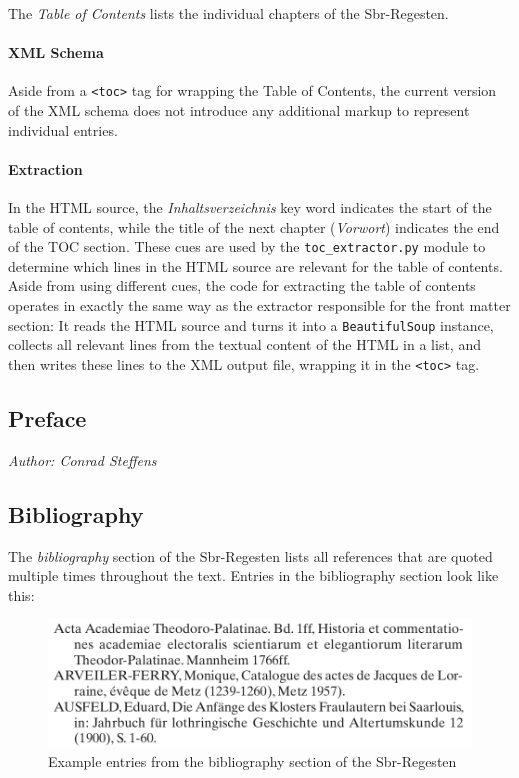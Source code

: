 The \emph{Table of Contents} lists the individual chapters of the
Sbr-Regesten.

\paragraph{XML Schema}

Aside from a \texttt{<toc>} tag for wrapping the Table of Contents,
the current version of the XML schema does not introduce any
additional markup to represent individual entries.

\paragraph{Extraction}

In the HTML source, the \emph{Inhaltsverzeichnis} key word indicates
the start of the table of contents, while the title of the next
chapter (\emph{Vorwort}) indicates the end of the TOC section. These
cues are used by the \texttt{toc\_extractor.py} module to determine
which lines in the HTML source are relevant for the table of contents.
Aside from using different cues, the code for extracting the table of
contents operates in exactly the same way as the extractor responsible
for the front matter section: It reads the HTML source and turns it
into a \texttt{BeautifulSoup} instance, collects all relevant lines
from the textual content of the HTML in a list, and then writes these
lines to the XML output file, wrapping it in the \texttt{<toc>} tag.

\subsection{Preface}
\label{sec:preface}

\emph{Author: Conrad Steffens} \\

\subsection{Bibliography}
\label{sec:bibl}

The \emph{bibliography} section of the Sbr-Regesten lists all
references that are quoted multiple times throughout the text. Entries
in the bibliography section look like this:

\begin{figure}[h]
  \centering
  \includegraphics[scale=0.3]{img/bibl-entries}
  \caption{Example entries from the bibliography section of the Sbr-Regesten}
  \label{fig:bibl-entries}
\end{figure}

